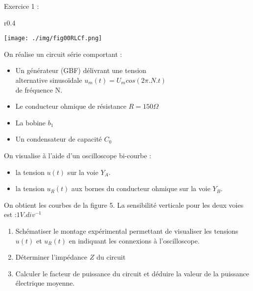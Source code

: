\documentclass[12pt, french]{article}
\begin{document}
\begin{center}

\vspace{-2cm}
\end{center}

\vspace{-0.5cm}
   \begin{Box2}{Exercice 1 : }
	   \begin{wrapfigure}[0]{r}{0.4\textwidth}
  \begin{center}
	  \vspace{-0.6cm}
	\texttt{[image: ./img/fig00RLCf.png]}
  \end{center}
\end{wrapfigure}

On réalise un circuit série comportant :

\begin{itemize}
  \item  Un générateur (GBF) délivrant une tension \\alternative sinusoïdale
$u_m(t)= U_m cos(2\pi.N.t)$ \\de fréquence N.
\item  Le conducteur ohmique de résistance $R =150\Omega$
\item La bobine $b_1$
\item Un condensateur de capacité $C_0$

\end{itemize}

On visualise à l’aide d’un oscilloscope bi-courbe :
\begin{itemize}
  \item la tension $u(t)$ sur la voie $Y_A$.
  \item la tension $u_R(t)$ aux bornes du conducteur ohmique sur la voie $Y_B$.
\end{itemize}

     On obtient les courbes de la figure 5.
     La sensibilité verticale pour les deux voies est :$1 V.div^{-1}$

\begin{enumerate}
  \item Schématiser le montage expérimental permettant de
visualiser les tensions $u(t)$ et $u_R (t)$ en indiquant les
connexions à l’oscilloscope. 
\item Déterminer l’impédance $Z$ du circuit
\item Calculer le facteur de puissance du circuit et déduire la valeur de la puissance électrique moyenne.
\end{enumerate}
\end{Box2}
\end{document}
